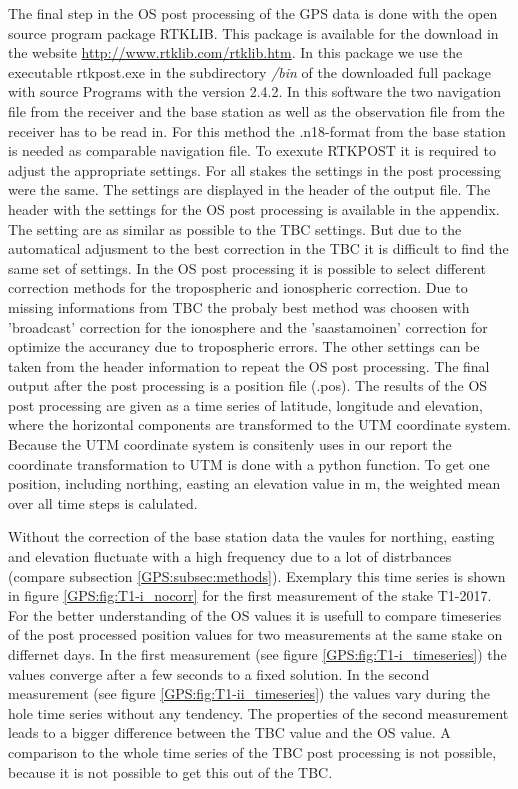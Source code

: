 The final step in the OS post processing of the GPS data is done with the open source program package RTKLIB.
This package is available for the download in the website \url{http://www.rtklib.com/rtklib.htm}.
In this package we use the executable rtkpost.exe in the subdirectory \textit{/bin} of the downloaded full package with source Programs with the version 2.4.2.
In this software the two navigation file from the receiver and the base station as well as the observation file from the receiver has to be read in.
For this method the .n18-format from the base station is needed as comparable navigation file. 
To exexute RTKPOST it is required to adjust the appropriate settings.
For all stakes the settings in the post processing were the same.
The settings are displayed in the header of the output file.
The header with the settings for the OS post processing is available in the appendix.
The setting are as similar as possible to the TBC settings.
But due to the automatical adjusment to the best correction in the TBC it is difficult to find the same set of settings.
In the OS post processing it is possible to select different correction methods for the tropospheric and ionospheric correction. 
Due to missing informations from TBC the probaly best method was choosen with 'broadcast' correction for the ionosphere and the 'saastamoinen' correction for optimize the accurancy due to tropospheric errors. 
The other settings can be taken from the header information to repeat the OS post processing. 
The final output after the post processing is a position file (.pos). 
The results of the OS post processing are given as a time series of latitude, longitude and elevation, where the horizontal components are transformed to the UTM coordinate system. 
Because the UTM coordinate system is consitenly uses in our report the coordinate transformation to UTM is done with a python function.
To get one position, including northing, easting an elevation value in m, the weighted mean over all time steps is calulated.
\medskip

Without the correction of the base station data the vaules for northing, easting and elevation fluctuate with a high frequency due to a lot of distrbances (compare subsection \ref{GPS:subsec:methods}). 
Exemplary this time series is shown in figure \ref{GPS:fig:T1-i_nocorr} for the first measurement of the stake T1-2017.
For the better understanding of the OS values it is usefull to compare timeseries of the post processed position values for two measurements at the same stake on differnet days.
In the first measurement (see figure \ref{GPS:fig:T1-i_timeseries}) the values converge after a few seconds to a fixed solution.
In the second measurement (see figure \ref{GPS:fig:T1-ii_timeseries}) the values vary during the hole time series without any tendency.
The properties of the second measurement leads to a bigger difference between the TBC value and the OS value.
A comparison to the whole time series of the TBC post processing is not possible, because it is not possible to get this out of the TBC.

